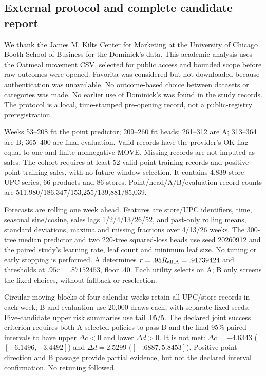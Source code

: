 \subsection{External protocol and complete candidate report}\label{app:external-v12}
We thank the James M. Kilts Center for Marketing at the University of Chicago Booth School of Business for the Dominick's data. This academic analysis uses the Oatmeal movement CSV, selected for public access and bounded scope before raw outcomes were opened. Favorita was considered but not downloaded because authentication was unavailable. No outcome-based choice between datasets or categories was made. No earlier use of Dominick's was found in the study records. The protocol is a local, time-stamped pre-opening record, not a public-registry preregistration.

Weeks 53--208 fit the point predictor; 209--260 fit heads; 261--312 are A; 313--364 are B; 365--400 are final evaluation. Valid records have the provider's OK flag equal to one and finite nonnegative MOVE. Missing records are not imputed as sales. The cohort requires at least 52 valid point-training records and positive point-training sales, with no future-window selection. It contains 4,839 store--UPC series, 66 products and 86 stores. Point/head/A/B/evaluation record counts are 511,980/186,347/153,255/139,881/85,039.

Forecasts are rolling one week ahead. Features are store/UPC identifiers, time, seasonal sine/cosine, sales lags 1/2/4/13/26/52, and past-only rolling means, standard deviations, maxima and missing fractions over 4/13/26 weeks. The 300-tree median predictor and two 220-tree squared-loss heads use seed 20260912 and the paired study's learning rate, leaf count and minimum leaf size. No tuning or early stopping is performed. A determines $r=.95R_{\rm all,A}=.91739424$ and thresholds at $.95r=.87152453$, floor .40. Each utility selects on A; B only screens the fixed choices, without fallback or reselection.

Circular moving blocks of four calendar weeks retain all UPC/store records in each week; B and evaluation use 20,000 draws each, with separate fixed seeds. Five-candidate upper risk summaries use tail .05/5. The declared joint success criterion requires both A-selected policies to pass B and the final 95\% paired intervals to have upper $\Delta c<0$ and lower $\Delta d>0$. It is not met: $\Delta c=-4.6343$ ($[-6.1496,-3.4492]$) and $\Delta d=2.5299$ ($[-.6887,5.8453]$). Positive point direction and B passage provide partial evidence, but not the declared interval confirmation. No retuning followed.

